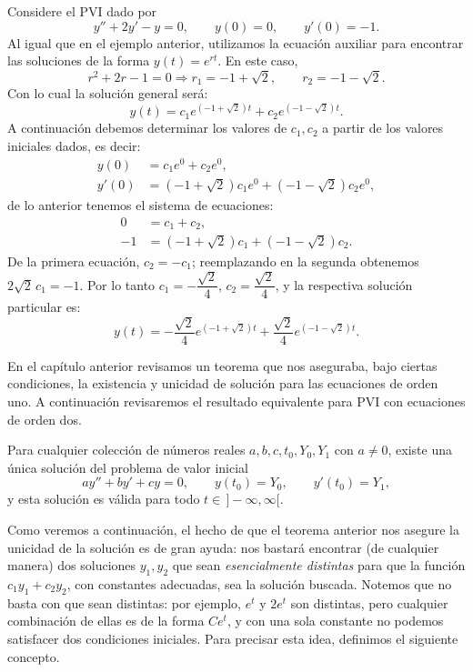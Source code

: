\begin{example}
     Considere el PVI dado por
     \[
     y''+2y'-y=0,\qquad y(0)=0,\qquad y'(0)=-1.
     \]
     Al igual que en el ejemplo anterior, utilizamos la ecuaci\'on auxiliar para encontrar las soluciones de la forma $y(t)=e^{rt}$. En este caso,
     \[
     r^2+2r-1=0\Longrightarrow r_1=-1+\sqrt{2},\qquad r_2=-1-\sqrt{2}.
     \]
     Con lo cual la soluci\'on general ser\'a:
     \[
     y(t)=c_1e^{(-1+\sqrt{2})t}+c_2e^{(-1-\sqrt{2})t}.
     \]
     A continuaci\'on debemos determinar los valores de $c_1,c_2$ a partir de los valores iniciales dados, es decir:
     \begin{align*}
         y(0)&=c_1e^0+c_2e^0,\\
         y'(0)&=(-1+\sqrt{2})c_1e^0+(-1-\sqrt{2})c_2e^0,
     \end{align*}
     de lo anterior tenemos el sistema de ecuaciones:
     \begin{align*}
         0&=c_1+c_2,\\
         -1&=(-1+\sqrt{2})c_1+(-1-\sqrt{2})c_2.
     \end{align*}
     De la primera ecuaci\'on, $c_2=-c_1$; reemplazando en la segunda obtenemos $2\sqrt{2}\,c_1=-1$. Por lo tanto $c_1=-\dfrac{\sqrt{2}}{4}$, $c_2=\dfrac{\sqrt{2}}{4}$, y la respectiva soluci\'on particular es:
     \[
     y(t)=-\dfrac{\sqrt{2}}{4}e^{(-1+\sqrt{2})t}+\dfrac{\sqrt{2}}{4}e^{(-1-\sqrt{2})t}.
     \]
\end{example}

En el cap\'itulo anterior revisamos un teorema que nos aseguraba, bajo ciertas condiciones, la existencia y unicidad de soluci\'on para las ecuaciones de orden uno. A continuaci\'on revisaremos el resultado equivalente para PVI con ecuaciones de orden dos.

\begin{theorem}
    Para cualquier colecci\'on de n\'umeros reales $a,b,c,t_0,Y_0,Y_1$ con $a\neq 0$, existe una \'unica soluci\'on del problema de valor inicial
    \[
    ay''+by'+cy=0,\qquad y(t_0)=Y_0,\qquad y'(t_0)=Y_1,
    \]
    y esta soluci\'on es v\'alida para todo $t\in\, ]-\infty,\infty[$.
\end{theorem}

Como veremos a continuaci\'on, el hecho de que el teorema anterior nos asegure la unicidad de la soluci\'on es de gran ayuda: nos bastar\'a encontrar (de cualquier manera) dos soluciones $y_1,y_2$ que sean \emph{esencialmente distintas} para que la funci\'on $c_1y_1+c_2y_2$, con constantes adecuadas, sea la soluci\'on buscada. Notemos que no basta con que sean distintas: por ejemplo, $e^{t}$ y $2e^{t}$ son distintas, pero cualquier combinaci\'on de ellas es de la forma $Ce^{t}$, y con una sola constante no podemos satisfacer dos condiciones iniciales. Para precisar esta idea, definimos el siguiente concepto.

